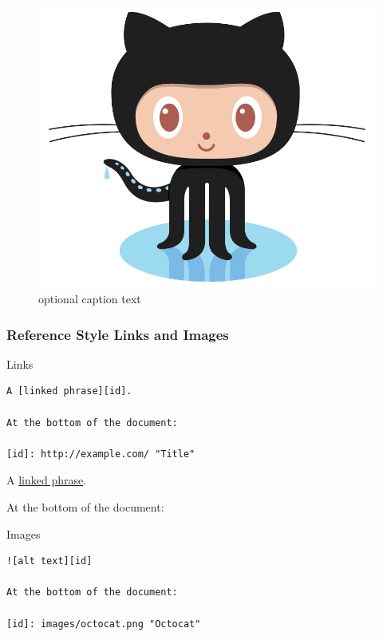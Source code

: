 \documentclass[]{book}
\theoremstyle{definition}
\theoremstyle{definition}
\theoremstyle{definition}
\theoremstyle{remark}
\begin{document}
\begin{figure}
\centering
\includegraphics{images/octocat.png}
\caption{optional caption text}
\end{figure}

\subsubsection{Reference Style Links and
Images}\label{reference-style-links-and-images}

Links

\begin{verbatim}
A [linked phrase][id].

At the bottom of the document:

[id]: http://example.com/ "Title"
\end{verbatim}

A \href{images/octocat.png}{linked phrase}.

At the bottom of the document:

Images

\begin{verbatim}
![alt text][id]

At the bottom of the document:

[id]: images/octocat.png "Octocat"
\end{verbatim}
\end{document}
